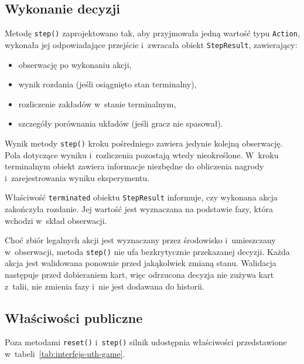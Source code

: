 \subsection{Wykonanie decyzji}
\label{subsec:interfejs-step}

Metodę \texttt{step()} zaprojektowano tak, aby przyjmowała jedną wartość typu \texttt{Action},
wykonała jej odpowiadające przejście i~zwracała obiekt \texttt{StepResult},
zawierający:

\begin{itemize}
    \item obserwację po wykonaniu akcji,
    \item wynik rozdania (jeśli osiągnięto stan terminalny),
    \item rozliczenie zakładów w~stanie terminalnym,
    \item szczegóły porównania układów (jeśli gracz nie spasował).
\end{itemize}

Wynik metody \texttt{step()} kroku pośredniego zawiera jedynie kolejną obserwację. Pola dotyczące
wyniku i~rozliczenia pozostają wtedy nieokreślone. W~kroku terminalnym
obiekt zawiera informacje niezbędne do obliczenia nagrody
i~zarejestrowania wyniku eksperymentu.

Właściwość \texttt{terminated} obiektu \texttt{StepResult} informuje,
czy wykonana akcja zakończyła rozdanie. Jej wartość jest wyznaczana na
podstawie fazy, która wchodzi w~skład obserwacji.

Choć zbiór legalnych akcji jest wyznaczany przez środowisko i~umieszczany
w~obserwacji, metoda \texttt{step()} nie ufa bezkrytycznie przekazanej decyzji.
Każda akcja jest walidowana ponownie przed jakąkolwiek zmianą stanu. Walidacja następuje przed
dobieraniem kart, więc odrzucona decyzja nie zużywa kart z~talii, nie zmienia fazy
i~nie jest dodawana do historii.

\subsection{Właściwości publiczne}
\label{subsec:wlasciwosci-publiczne}

Poza metodami \texttt{reset()} i~\texttt{step()} silnik udostępnia
właściwości przedstawione w~tabeli~\ref{tab:interfejs-uth-game}.

